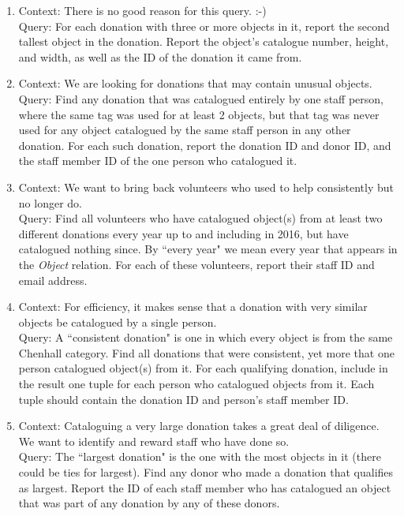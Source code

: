 \documentclass{article}
\begin{document}
\begin{enumerate}
\item
Context: There is no good reason for this query. :-) \\[5pt]
Query:
For each donation with three or more objects in it,
report the second tallest object in the donation.
Report the object's catalogue number, height, and width,
as well as the ID of the donation it came from.


\item
Context: We are looking for donations that may contain unusual objects. \\[5pt]
Query:
Find any donation that was catalogued entirely by one staff person,
where the same tag was used for at least 2 objects,
but that tag was never used for any object catalogued by the same staff person
in any other donation.
For each such donation,
report the donation ID and donor ID, and the staff member ID of the one person who
catalogued it.


\item
Context: We want to bring back volunteers who used to help consistently but no longer do. \\[5pt]
Query:
Find all volunteers who have catalogued object(s) from at least two different donations
every year up to and including in 2016,
but have catalogued nothing since.
By ``every year" we mean every year that appears in the \textit{Object} relation.
For each of these volunteers,
report their staff ID and email address.


\item
Context: For efficiency, it makes sense that a donation with very similar objects be catalogued by a single person. \\[5pt]
Query:
A ``consistent donation" is one in which every object is from the same Chenhall category.
Find all donations that were consistent, yet more that one person catalogued object(s) from it.
For each qualifying donation,
include in the result one tuple for each person who catalogued objects from it.
Each tuple should contain the donation ID and person's staff member ID.


\item
Context: Cataloguing a very large donation takes a great deal of diligence.  
We want to identify and reward staff who have done so. \\[5pt]
Query:
The ``largest donation" is the one with the most objects in it
(there could be ties for largest).
Find any donor who made a donation that qualifies as largest.
Report the ID of each staff member who has catalogued an object that was part of any donation
by any of these donors.



\end{enumerate}
\end{document}
